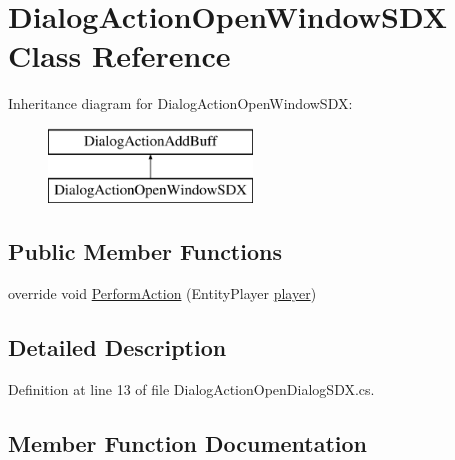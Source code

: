 \hypertarget{class_dialog_action_open_window_s_d_x}{}\section{Dialog\+Action\+Open\+Window\+S\+DX Class Reference}
\label{class_dialog_action_open_window_s_d_x}
Inheritance diagram for Dialog\+Action\+Open\+Window\+S\+DX\+:\begin{figure}[H]
\begin{center}
\leavevmode
\includegraphics[height=2.000000cm]{d6/d36/class_dialog_action_open_window_s_d_x}
\end{center}
\end{figure}
\subsection*{Public Member Functions}
\begin{DoxyCompactItemize}
\item 
override void \mbox{\hyperlink{class_dialog_action_open_window_s_d_x_a2112561f34bb76575e650aaf3100325f}{Perform\+Action}} (Entity\+Player \mbox{\hyperlink{_sphere_i_i_01_music_01_boxes_2_config_2_localization_8txt_a4e2cb8aeff651600ea1cc57fe5a929a4}{player}})
\end{DoxyCompactItemize}


\subsection{Detailed Description}


Definition at line 13 of file Dialog\+Action\+Open\+Dialog\+S\+D\+X.\+cs.



\subsection{Member Function Documentation}
\mbox{\label{class_dialog_action_open_window_s_d_x_a2112561f34bb76575e650aaf3100325f}} 
